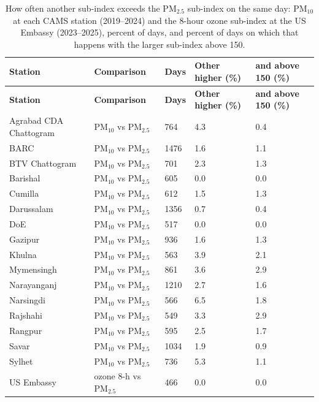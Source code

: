 \begingroup\footnotesize
\begin{longtable}{L{3.6cm} L{3.4cm} C{1.2cm} C{2.4cm} C{2.6cm}}
\caption{How often another sub-index exceeds the PM$_{2.5}$ sub-index on the same day: PM$_{10}$ at each CAMS station (2019--2024) and the 8-hour ozone sub-index at the US Embassy (2023--2025), percent of days, and percent of days on which that happens with the larger sub-index above 150.}\label{tab:s-aqi}\\
\toprule
\textbf{Station} & \textbf{Comparison} & \textbf{Days} & \textbf{Other higher (\%)} & \textbf{and above 150 (\%)} \\
\midrule\endfirsthead
\toprule
\textbf{Station} & \textbf{Comparison} & \textbf{Days} & \textbf{Other higher (\%)} & \textbf{and above 150 (\%)} \\
\midrule\endhead
\bottomrule\endfoot
Agrabad CDA Chattogram & PM$_{10}$ vs PM$_{2.5}$ & 764 & 4.3 & 0.4 \\
BARC & PM$_{10}$ vs PM$_{2.5}$ & 1476 & 1.6 & 1.1 \\
BTV Chattogram & PM$_{10}$ vs PM$_{2.5}$ & 701 & 2.3 & 1.3 \\
Barishal & PM$_{10}$ vs PM$_{2.5}$ & 605 & 0.0 & 0.0 \\
Cumilla & PM$_{10}$ vs PM$_{2.5}$ & 612 & 1.5 & 1.3 \\
Darussalam & PM$_{10}$ vs PM$_{2.5}$ & 1356 & 0.7 & 0.4 \\
DoE & PM$_{10}$ vs PM$_{2.5}$ & 517 & 0.0 & 0.0 \\
Gazipur & PM$_{10}$ vs PM$_{2.5}$ & 936 & 1.6 & 1.3 \\
Khulna & PM$_{10}$ vs PM$_{2.5}$ & 563 & 3.9 & 2.1 \\
Mymensingh & PM$_{10}$ vs PM$_{2.5}$ & 861 & 3.6 & 2.9 \\
Narayanganj & PM$_{10}$ vs PM$_{2.5}$ & 1210 & 2.7 & 1.6 \\
Narsingdi & PM$_{10}$ vs PM$_{2.5}$ & 566 & 6.5 & 1.8 \\
Rajshahi & PM$_{10}$ vs PM$_{2.5}$ & 549 & 3.3 & 2.9 \\
Rangpur & PM$_{10}$ vs PM$_{2.5}$ & 595 & 2.5 & 1.7 \\
Savar & PM$_{10}$ vs PM$_{2.5}$ & 1034 & 1.9 & 0.9 \\
Sylhet & PM$_{10}$ vs PM$_{2.5}$ & 736 & 5.3 & 1.1 \\
US Embassy & ozone 8-h vs PM$_{2.5}$ & 466 & 0.0 & 0.0 \\
\end{longtable}
\endgroup
